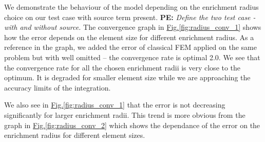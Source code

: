 \documentclass[preprint,12pt]{elsarticle}
\newcommand{\fig}[1]{\hyperref[#1]{Fig.\ref{#1}}}
\newcommand{\notePE}[1]{{\color{Orange} \textbf{PE: } \textit{#1}}}
\begin{document}
We demonstrate the behaviour of the model depending on the enrichment radius choice on our test case with 
source term present. \notePE{Define the two test case - with and without source.}
The convergence graph in \fig{fig:radius_conv_1} shows how the error depends on the element size for different 
enrichment radius. As a reference in the graph, we added the error of classical FEM applied on the same problem 
but with well omitted -- the convergence rate is optimal 2.0. We see that the convergence rate for all the 
chosen enrichment radii is very close to the optimum. It is degraded for smaller element size while we are
approaching the accuracy limits of the integration.

We also see in \fig{fig:radius_conv_1} that the error is not decreasing significantly for larger enrichment 
radii. This trend is more obvious from the graph in \fig{fig:radius_conv_2} which shows the dependance of the
error on the enrichment radius for different element sizes.
\end{document}
